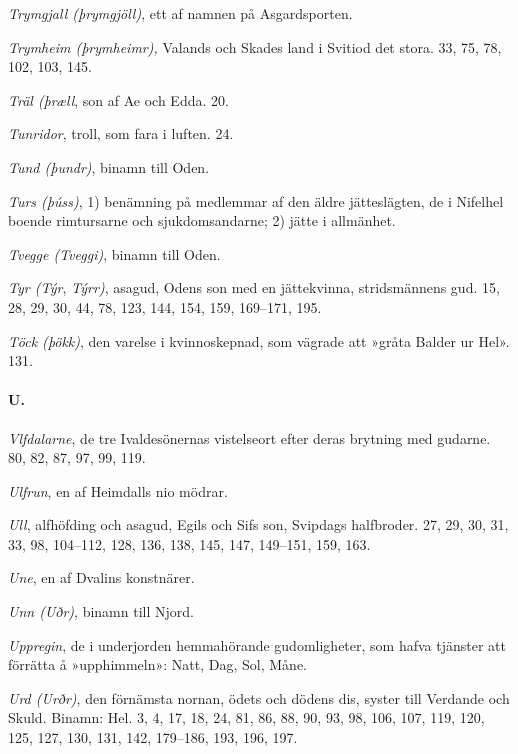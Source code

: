 \emph{Trymgjall (þrymgjöll)}, ett af namnen på Asgardsporten.

\emph{Trymheim (þrymheimr),} Valands och Skades land i Svitiod det
stora. 33, 75, 78, 102, 103, 145.

\emph{Träl (þræll}, son af Ae och Edda. 20.

\emph{Tunridor}, troll, som fara i luften. 24.

\emph{Tund (þundr)}, binamn till Oden.

\emph{Turs (þúss)}, 1) benämning på medlemmar af den äldre jätteslägten,
de i Nifelhel boende rimtursarne och sjukdomsandarne; 2) jätte i
allmänhet.

\emph{Tvegge (Tveggi)}, binamn till Oden.

\emph{Tyr (Týr}, \emph{Týrr)}, asagud, Odens son med en jättekvinna,
stridsmännens gud. 15, 28, 29, 30, 44, 78, 123, 144, 154, 159, 169--171,
195.

\emph{Töck (þökk)}, den varelse i kvinnoskepnad, som vägrade att »gråta
Balder ur Hel». 131.

\paragraph{U.}

\emph{Vlfdalarne}, de tre Ivaldesönernas vistelseort efter deras
brytning med gudarne. 80, 82, 87, 97, 99, 119.

\emph{Ulfrun}, en af Heimdalls nio mödrar.

\emph{Ull}, alfhöfding och asagud, Egils och Sifs son, Svipdags
halfbroder.
\protect\hypertarget{lb1625905.xhtmlux5cux23start243}{}{}\protect\hypertarget{lb1625905.xhtmlux5cux23start243-a}{}{}\protect\hypertarget{lb1625905.xhtmlux5cux23start243-b}{}{}\protect\hypertarget{lb1625905.xhtmlux5cux23start243-c}{}{}\protect\hypertarget{lb1625905.xhtmlux5cux23start243-d}{}{}
27, 29, 30, 31, 33, 98, 104--112, 128, 136, 138, 145, 147, 149--151,
159, 163.

\emph{Une}, en af Dvalins konstnärer.

\emph{Unn (Uðr)}, binamn till Njord.

\emph{Uppregin}, de i underjorden hemmahörande gudomligheter, som hafva
tjänster att förrätta å »upphimmeln»: Natt, Dag, Sol, Måne.

\emph{Urd (Urðr)}, den förnämsta nornan, ödets och dödens dis, syster
till Verdande och Skuld. Binamn: Hel. 3, 4, 17, 18, 24, 81, 86, 88, 90,
93, 98, 106, 107, 119, 120, 125, 127, 130, 131, 142, 179--186, 193, 196,
197.

